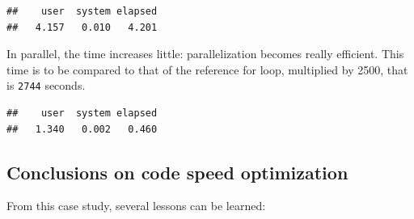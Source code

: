 \documentclass[
  12pt,
  american,
  a4paper,
  extrafontsizes,onecolumn,openright
  ]{memoir}
\newenvironment{Shaded}{\begin{snugshade}}{\end{snugshade}}
\newcommand{\DecValTok}[1]{\textcolor[rgb]{0.00,0.00,0.81}{#1}}
\newcommand{\FunctionTok}[1]{\textcolor[rgb]{0.13,0.29,0.53}{\textbf{#1}}}
\newcommand{\NormalTok}[1]{#1}
\newcommand{\OtherTok}[1]{\textcolor[rgb]{0.56,0.35,0.01}{#1}}
\newcommand{\SpecialCharTok}[1]{\textcolor[rgb]{0.81,0.36,0.00}{\textbf{#1}}}
\begin{document}
\scriptsize

\begin{Shaded}
\end{Shaded}

\begin{verbatim}
##    user  system elapsed 
##   4.157   0.010   4.201
\end{verbatim}

\normalsize

In parallel, the time increases little: parallelization becomes really efficient.
This time is to be compared to that of the reference for loop, multiplied by 2500, that is \texttt{2744} seconds.

\scriptsize

\begin{Shaded}
\end{Shaded}

\begin{verbatim}
##    user  system elapsed 
##   1.340   0.002   0.460
\end{verbatim}

\normalsize

\subsection{Conclusions on code speed optimization}\label{conclusions-on-code-speed-optimization}

From this case study, several lessons can be learned:
\end{document}
